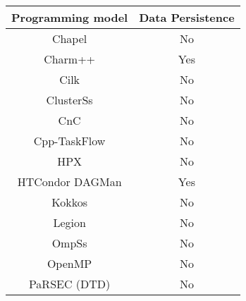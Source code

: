 \begin{tabular}{cc}
\hline
Programming model & Data Persistence \\
\hline
Chapel & No\\
Charm++ & Yes\\
Cilk & No\\
ClusterSs & No\\
CnC & No\\
Cpp-TaskFlow & No\\
HPX & No\\
HTCondor DAGMan & Yes\\
Kokkos & No\\
Legion & No\\
OmpSs & No\\
OpenMP & No\\
PaRSEC (DTD) & No\\
\hline
\end{tabular}
